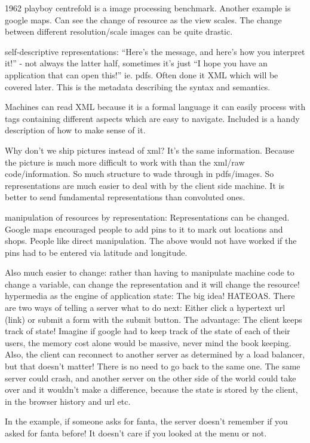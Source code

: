 \documentclass[11pt]{article}
\begin{document}
1962 playboy centrefold is a image processing benchmark. Another example is google maps. Can see the change of resource as the view scales. The change between different resolution/scale images can be quite drastic.

self-descriptive representations: “Here’s the message, and here’s how you interpret it!” - not always the latter half, sometimes it’s just “I hope you have an application that can open this!” ie. pdfs. Often done it XML which will be covered later. This is the metadata describing the syntax and semantics. 

Machines can read XML because it is a formal language it can easily process with tags containing different aspects which are easy to navigate. Included is a handy description of how to make sense of it.

Why don’t we ship pictures instead of xml? It’s the same information. Because the picture is much more difficult to work with than the xml/raw code/information. So much structure to wade through in pdfs/images. So representations are much easier to deal with by the client side machine. It is better to send fundamental representations than convoluted ones.

manipulation of resources by representation: Representations can be changed. Google maps encouraged people to add pins to it to mark out locations and shops. People like direct manipulation. The above would not have worked if the pins had to be entered via latitude and longitude.

Also much easier to change: rather than having to manipulate machine code to change a variable, can change the representation and it will change the resource!
hypermedia as the engine of application state: The big idea! HATEOAS. There are two ways of telling a server what to do next: Either click a hypertext url (link) or submit a form with the submit button. The advantage: The client keeps track of state! Imagine if google had to keep track of the state of each of their users, the memory cost alone would be massive, never mind the book keeping. Also, the client can reconnect to another server as determined by a load balancer, but that doesn’t matter! There is no need to go back to the same one. The same server could crash, and another server on the other side of the world could take over and it wouldn’t make a difference, because the state is stored by the client, in the browser history and url etc.

In the example, if someone asks for fanta, the server doesn’t remember if you asked for fanta before! It doesn’t care if you looked at the menu or not.
\end{document}
